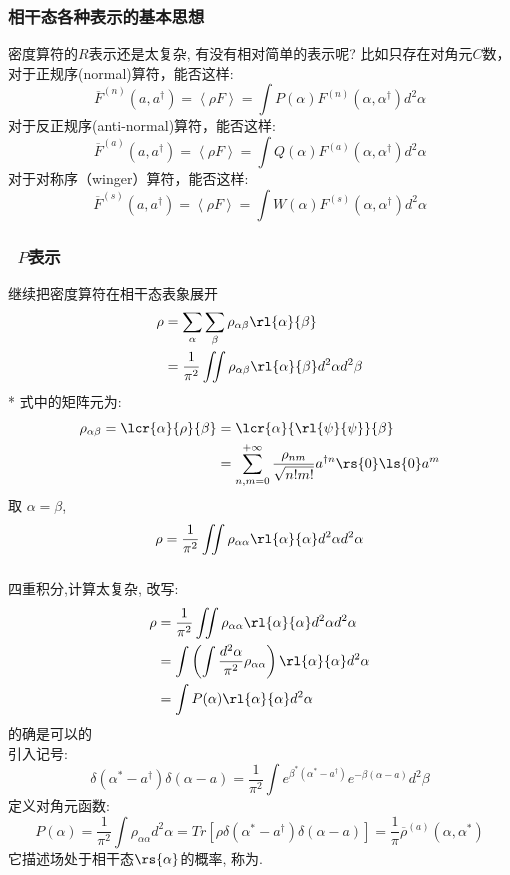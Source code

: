  \begin{frame} 
 \frametitle{相干态各种表示的基本思想}
    密度算符的$R$表示还是太复杂, 有没有相对简单的表示呢? 比如只存在对角元$C$数， \\
    对于正规序(normal)算符，能否这样:
    \[ \overline{F}^{(n)}(a, a^{\dagger}) = \left\langle \rho F \right\rangle = \int P(\alpha) F^{(n)} (\alpha, \alpha^{\dagger}) d^2 \alpha \]
    对于反正规序(anti-normal)算符，能否这样:
    \[ \overline{F}^{(a)}(a, a^{\dagger}) = \left\langle \rho F \right\rangle = \int Q(\alpha) F^{(a)}(\alpha, \alpha^{\dagger}) d^2 \alpha\]
    对于对称序（winger）算符，能否这样:
    \[ \overline{F}^{(s)}(a, a^{\dagger}) = \left\langle \rho F \right\rangle = \int W(\alpha) F^{(s)}(\alpha, \alpha^{\dagger}) d^2 \alpha\]
 \end{frame}

\begin{frame}  
  \frametitle{~$P$表示}
    继续把密度算符在相干态表象展开
    \[ \begin{aligned}
      \rho  &= \sum_\alpha\sum_\beta \rho_{\alpha \beta}\rl{\alpha}{\beta} \\
      &= \frac{1}{\pi^2} \iint \rho_{\alpha \beta}\rl{\alpha}{\beta} d^2 \alpha d^2 \beta 
    \end{aligned}\]
    *  式中的矩阵元为: 
    \[ \begin{aligned}
        \rho_{\alpha \beta} = \lcr{\alpha}{\rho}{\beta} &= \lcr{\alpha}{\rl{\psi}{\psi}}{\beta} \\ 
        &= \sum_{n,m=0} ^{+\infty} \frac{\rho_{nm}}{\sqrt{n!m!}} a^{\dagger n } \rs{0 } \ls{0} a^{ m } 
      \end{aligned}\]
    取 $\alpha=\beta$, 
    \[ \rho = \frac{1}{\pi^2} \iint \rho_{\alpha \alpha}\rl{\alpha}{\alpha} d^2 \alpha d^2 \alpha \]   
   \end{frame}

   \begin{frame} 
    \frametitle{}
    四重积分,计算太复杂, 改写:
    \[ \begin{aligned}
        \rho & = \frac{1}{\pi^2} \iint \rho_{\alpha \alpha}\rl{\alpha}{\alpha} d^2 \alpha d^2 \alpha \\ 
        & =  \int \left( \int\frac{d^2 \alpha}{\pi^2} \rho_{\alpha \alpha}\right)\rl{\alpha}{\alpha}  d^2 \alpha \\ 
        & =  \int P(\alpha) \rl{\alpha}{\alpha}  d^2 \alpha
      \end{aligned}\] 
    的确是可以的 \\ {\vspace*{0.3em}}
    引入记号:
    \[ \delta(\alpha^* -a^{\dagger})\delta(\alpha -a) = \frac{1}{\pi^2}\int e^{\beta^* (\alpha^* -a^{\dagger})}e^{-\beta (\alpha -a )} d^2 \beta\]
    定义对角元函数:
    \[ P(\alpha) = \frac{1}{\pi^2} \int \rho_{\alpha \alpha}d^2 \alpha=Tr[\rho \delta(\alpha^* -a^{\dagger})\delta(\alpha -a)]=\frac{1}{\pi} \overline{\rho}^{(a)}(\alpha, \alpha^*) \]
    它描述场处于相干态$\rs{\alpha }$的概率, 称为{\color{red}{准概率-$P$函数}}.
    \end{frame}
    
